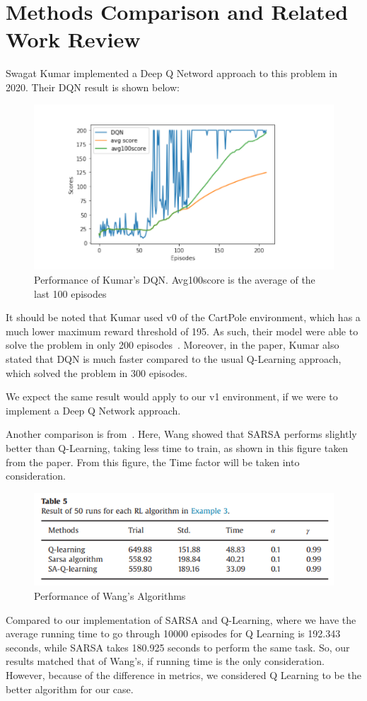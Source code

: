 \section{Methods Comparison and Related Work Review}

Swagat Kumar implemented a Deep Q Netword approach to this problem in 2020.
Their DQN result is shown below:

\begin{figure}[H] %
    \centering
    \includegraphics[width=0.75\linewidth]{kumar-2020-dqn.png}
    \caption{Performance of Kumar's DQN. Avg100score is the average of the last 100 episodes}
\end{figure}

It should be noted that Kumar used v0 of the CartPole environment, which has a much lower maximum reward threshold of 195. As such,
their model were able to solve the problem in only 200 episodes~\citep{kumar2020balancing}. Moreover, in the paper, Kumar also stated that
DQN is much faster compared to the usual Q-Learning approach, which solved the problem in 300 episodes.

We expect the same result would apply to our v1 environment, if we were to implement a Deep Q Network approach.

Another comparison is from~\citep{wang2013backward}. Here, Wang showed that SARSA performs slightly better than Q-Learning, taking less time to train, as shown
in this figure taken from the paper. From this figure, the Time factor will be taken into consideration.

\begin{figure}[H] %
    \centering
    \includegraphics[width=0.75\linewidth]{wang-table.png}
    \caption{Performance of Wang's Algorithms}
\end{figure}

Compared to our implementation of SARSA and Q-Learning, where we have the average running time to go through 10000 episodes for Q Learning is 192.343 seconds, while SARSA takes 180.925 seconds to perform the same task.
So, our results matched that of Wang's, if running time is the only consideration. However, because of the difference in metrics, we considered Q Learning to be the better algorithm for our case.